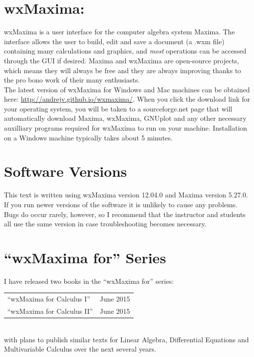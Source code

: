 \documentclass[10.5pt,twoside]{report}
\theoremstyle{definition}
\begin{document}
\section*{\large{wxMaxima:}}

wxMaxima is a user interface for the computer algebra system
Maxima.   The interface allows the user to build, edit and save a 
document (a .wxm file) containing many calculations and graphics, 
and \textit{most} operations can be accessed through the GUI if desired.  Maxima and wxMaxima are open-source projects, which means they will always be free and they are always improving thanks to the pro bono work of their many enthusiasts.\\

The latest version of wxMaxima for Windows and Mac machines can be 
obtained here: \url{http://andrejv.github.io/wxmaxima/}.  When you click the 
download link for your operating system, you will be taken to a 
sourceforge.net page that will automatically download Maxima, 
wxMaxima, GNUplot and any other necessary auxilliary programs required 
for wxMaxima to run on your machine.  Installation on a Windows machine
typically takes about 5 minutes.


\section*{\large{Software Versions}}

This text is written using wxMaxima version 12.04.0 and Maxima version 
5.27.0.  If you run newer versions of the software it is 
unlikely to cause any problems.  Bugs do occur rarely, however, so I 
recommend that the instructor and students all use the same version 
in case troubleshooting becomes necessary.
\pagebreak

\section*{\large{``wxMaxima for'' Series}}

I have released two books in the ``wxMaxima for'' series:\\

\begin{tabular}{l c}
 ``wxMaxima for Calculus I''	&June 2015\\
 ``wxMaxima for Calculus II'' &June 2015\\

\end{tabular}

${}$\\
with plans to publish similar texts for Linear Algebra, Differential Equations and Multivariable Calculus over the next several years.\\
\end{document}
